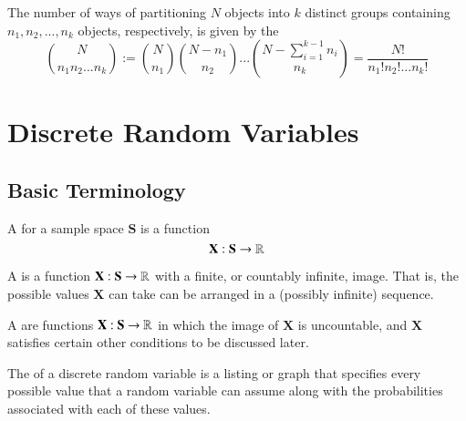 \documentclass[12pt]{report}
\begin{document}
\begin{defn}{}{}
    The number of ways of partitioning $N$ objects into $k$ distinct groups containing $n_1,n_2,...,n_k$ objects, respectively, is given by the  \begin{equation*}
        \binom{N}{n_1n_2...n_k} := \binom{N}{n_1}\binom{N-n_1}{n_2}...\binom{N - \sum_{i=1}^{k-1}n_i}{n_k} = \frac{N!}{n_1!n_2!...n_k!}
    \end{equation*}
\end{defn}






\chapter{Discrete Random Variables}


\section{Basic Terminology}

\begin{defn}{}{}
    A  for a sample space $\mathbf{S}$ is a function \begin{equation*}
        \mathbf{X}:\mathbf{S}\rightarrow \mathbb R
    \end{equation*}
\end{defn}

\begin{defn}{}{}
    A  is a function $\mathbf{X}:\mathbf{S}\rightarrow \mathbb R$ with a finite, or countably infinite, image. That is, the possible values $\mathbf{X}$ can take can be arranged in a (possibly infinite) sequence.
\end{defn}


\begin{defn}{}{}
    A  are functions $\mathbf{X}:\mathbf{S}\rightarrow \mathbb R$ in which the image of $\mathbf{X}$ is uncountable, and $\mathbf{X}$ satisfies certain other conditions to be discussed later.
\end{defn}

\begin{defn}{}{}
    The  of a discrete random variable is a listing or graph that specifies every possible value that a random variable can assume along with the probabilities associated with each of these values.
\end{defn}
\end{document}
